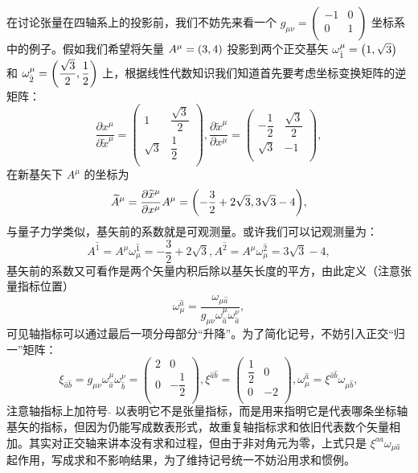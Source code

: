\documentclass[UTF8, 12pt, a4paper, oneside, onecolumn, fontset=none]{ctexart}
\begin{document}
在讨论张量在四轴系上的投影前，我们不妨先来看一个 $g_{\mu\nu}=\begin{pmatrix}
-1 & 0\\
0 & 1\\
\end{pmatrix}$ 坐标系中的例子。假如我们希望将矢量 $A^{\mu}=\mleft(3, 4\mright)$ 投影到两个正交基矢 $\omega^{\mu}_{\hat{1}}=\mleft(1,\sqrt{3}\mright)$ 和 $\omega^{\mu}_{\hat{2}}=\mleft(\dfrac{\sqrt{3}}{2},\dfrac{1}{2}\mright)$ 上，根据线性代数知识我们知道首先要考虑坐标变换矩阵的逆矩阵：
\begin{equation}
\frac{\partial{}x^{\mu}}{\partial\widetilde{x}^{\mu}}=\begin{pmatrix}
1 & \dfrac{\sqrt{3}}{2}\\
\sqrt{3} & \dfrac{1}{2}\\
\end{pmatrix},\frac{\partial\widetilde{x}^{\mu}}{\partial{}x^{\mu}}=\begin{pmatrix}
-\dfrac{1}{2} & \dfrac{\sqrt{3}}{2}\\
\sqrt{3} & -1\\
\end{pmatrix},
\end{equation}
在新基矢下 $A^{\mu}$ 的坐标为
\begin{equation}
\widetilde{A}^{\mu}=\frac{\partial\widetilde{x}^{\mu}}{\partial{}x^{\mu}}A^{\mu}=\mleft(-\frac{3}{2}+2\sqrt{3}, 3\sqrt{3}-4\mright),
\end{equation}
与量子力学类似，基矢前的系数就是可观测量。或许我们可以记观测量为：
\begin{equation}
A^{\hat{1}}=A^{\mu}\omega_{\mu}^{\hat{1}}=-\frac{3}{2}+2\sqrt{3}, A^{\hat{2}}=A^{\mu}\omega_{\mu}^{\hat{2}}=3\sqrt{3}-4,
\end{equation}
基矢前的系数又可看作是两个矢量内积后除以基矢长度的平方，由此定义（注意张量指标位置）
\begin{equation}
\omega_{\mu}^{\hat{a}}=\frac{\omega_{\mu\hat{a}}}{g_{\mu\nu}\omega^{\mu}_{\hat{a}}\omega^{\nu}_{\hat{a}}},
\end{equation}
可见轴指标可以通过最后一项分母部分“升降”。为了简化记号，不妨引入正交“归一”矩阵：
\begin{equation}
\xi_{\hat{a}\hat{b}}=g_{\mu\nu}\omega^{\mu}_{\hat{a}}\omega^{\nu}_{\hat{b}}=\begin{pmatrix}
2 & 0\\
0 & -\dfrac{1}{2}\\
\end{pmatrix},\xi^{\hat{a}\hat{b}}=\begin{pmatrix}
\dfrac{1}{2} & 0\\
0 & -2\\
\end{pmatrix},
\omega^{\hat{a}}_{\mu}=\xi^{\hat{a}\hat{b}}\omega_{\mu\hat{b}},
\end{equation}
注意轴指标上加符号 $\hat{}$ 以表明它不是张量指标，而是用来指明它是代表哪条坐标轴基矢的指标，但因为仍能写成数表形式，故重复轴指标求和依旧代表数个矢量相加。其实对正交轴来讲本没有求和过程，但由于非对角元为零，上式只是 $\xi^{aa}\omega_{\mu\hat{a}}$ 起作用，写成求和不影响结果，为了维持记号统一不妨沿用求和惯例。
\end{document}
